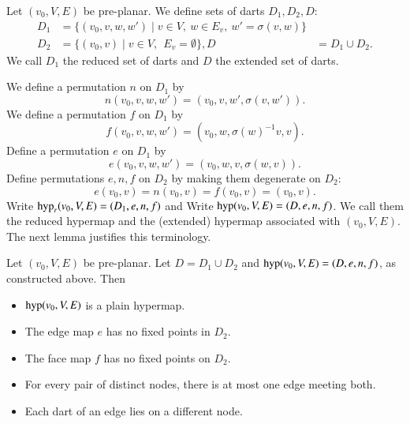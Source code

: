 Let $(v_0,V,E)$ be pre-planar.  We define sets of darts $D_1,D_2,D$:
    $$
    \begin{array}{lll}
    D_1 &= \{(v_0,v,w,w')\mid v\in V,\ w\in E_v,\ w' = \sigma(v,w)\}\\
    D_2 &= \{(v_0,v) \mid v\in V,\ \ E_v = \emptyset\},
    D   &= D_1\cup D_2.
    \end{array}
    $$
We call $D_1$ the reduced set of darts and $D$ the extended set of darts.

We define a permutation $n$ on $D_1$ by
    $$n(v_0,v,w,w') = (v_0,v,w',\sigma(v,w')).$$
We define a permutation $f$ on $D_1$ by
    $$
    f (v_0,v,w,w') = (v_0,w,\sigma(w)^{-1} v,v).
    $$
Define a permutation $e$ on $D_1$ by
    $$
    e (v_0,v,w,w') = (v_0,w,v,\sigma(w,v)).
    $$
Define permutations $e,n,f$ on $D_2$ by making them degenerate on $D_2$:
    $$
    e (v_0,v) = n(v_0,v) = f(v_0,v) = (v_0,v).
    $$
Write ${\operatorname{hyp}}_r(v_0,V,E)=(D_1,e,n,f)$ and
Write ${\operatorname{hyp}}(v_0,V,E)=(D,e,n,f)$.  We call them the reduced hypermap
and the (extended) hypermap associated with $(v_0,V,E)$.  The next
lemma justifies this terminology.


\begin{lemma} Let $(v_0,V,E)$ be pre-planar.  Let $D = D_1\cup D_2$
and ${\operatorname{hyp}}(v_0,V,E) = (D,e,n,f)$, as constructed above.  Then
    \begin{itemize}
    \item ${\operatorname{hyp}}(v_0,V,E)$ is a plain hypermap.
    \item The edge map $e$ has no fixed
points in $D_2$.
    \item The face map $f$ has no fixed points on $D_2$.
    \item For every pair of distinct nodes, there is at most one
    edge meeting both.
    \item Each dart of an edge lies on a different node.
    \end{itemize}
\end{lemma}


